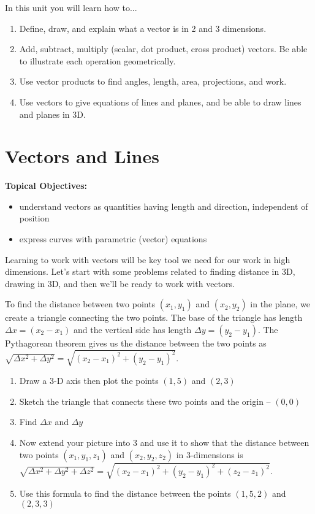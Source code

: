 \noindent 
In this unit you will learn how to...
\begin{enumerate}
\item Define, draw, and explain what a vector is in 2 and 3 dimensions.
\item Add, subtract, multiply (scalar, dot product, cross product) vectors. Be able to illustrate each operation geometrically.
\item Use vector products to find angles, length, area, projections, and work.
\item Use vectors to give equations of lines and planes, and be able to draw lines and planes in 3D.
\end{enumerate}

\clearpage

\normalsize
\section{Vectors and Lines}
\textbf{Topical Objectives:}
\begin{itemize}
\item understand vectors as quantities having length and direction, independent of position
\item express curves with parametric (vector) equations
\end{itemize}

Learning to work with vectors will be key tool we need for our work in high dimensions.  Let's start with some problems related to finding distance in 3D, drawing in 3D, and then we'll be ready to work with vectors.

\begin{problem}
To find the distance between two points $(x_1,y_1)$ and $(x_2,y_2)$ in the plane, we create a triangle connecting the two points.  The base of the triangle has length $\Delta x=(x_2-x_1)$ and the vertical side has length $\Delta y=(y_2-y_1)$. The Pythagorean theorem gives us the distance between the two points as $\sqrt{\Delta x^2+\Delta y^2}=\sqrt{(x_2-x_1)^2+(y_2-y_1)^2}$.\\

\begin{enumerate}
\item Draw a 3-D axis then plot the points $(1,5)$ and $(2,3)$
\item Sketch the triangle that connects these two points and the origin -- $(0,0)$
\item Find $\Delta x$ and $\Delta y$
\item Now extend your picture into 3 and use it to show that the distance between two points $(x_1,y_1,z_1)$ and $(x_2,y_2,z_2)$ in 3-dimensions is $\sqrt{\Delta x^2+\Delta y^2+\Delta z^2}=\sqrt{(x_2-x_1)^2+(y_2-y_1)^2+(z_2-z_1)^2}$.
\item Use this formula to find the distance between the points $(1,5,2)$ and $(2,3,3)$
\end{enumerate}
\end{problem}


